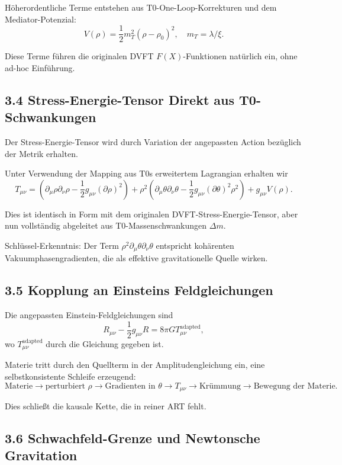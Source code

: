 \documentclass[12pt,a4paper]{article}
\begin{document}
	Höherordentliche Terme entstehen aus T0-One-Loop-Korrekturen und dem Mediator-Potenzial:
	\[
	V(\rho) = \frac{1}{2} m_T^2 (\rho - \rho_0)^2, \quad m_T = \lambda / \xi.
	\]
	
	Diese Terme führen die originalen DVFT $F(X)$-Funktionen natürlich ein, ohne ad-hoc Einführung.
	
	\subsection{3.4 Stress-Energie-Tensor Direkt aus T0-Schwankungen}
	
	Der Stress-Energie-Tensor wird durch Variation der angepassten Action bezüglich der Metrik erhalten.
	
	Unter Verwendung der Mapping aus T0s erweitertem Lagrangian erhalten wir
	\[
	T_{\mu\nu} = (\partial_\mu \rho \partial_\nu \rho - \frac{1}{2} g_{\mu\nu} (\partial \rho)^2) + \rho^2 (\partial_\mu \theta \partial_\nu \theta - \frac{1}{2} g_{\mu\nu} (\partial \theta)^2 \rho^2) + g_{\mu\nu} V(\rho).
	\]
	
	Dies ist identisch in Form mit dem originalen DVFT-Stress-Energie-Tensor, aber nun vollständig abgeleitet aus T0-Massenschwankungen $\Delta m$.
	
	Schlüssel-Erkenntnis: Der Term $\rho^2 \partial_\mu \theta \partial_\nu \theta$ entspricht kohärenten Vakuumphasengradienten, die als effektive gravitationelle Quelle wirken.
	
	\subsection{3.5 Kopplung an Einsteins Feldgleichungen}
	
	Die angepassten Einstein-Feldgleichungen sind
	\[
	R_{\mu\nu} - \frac{1}{2} g_{\mu\nu} R = 8\pi G T_{\mu\nu}^{\text{adapted}},
	\]
	wo $T_{\mu\nu}^{\text{adapted}}$ durch die Gleichung gegeben ist.
	
	Materie tritt durch den Quellterm in der Amplitudengleichung ein, eine selbstkonsistente Schleife erzeugend:
	\[
	\text{Materie} \to \text{perturbiert } \rho \to \text{Gradienten in } \theta \to T_{\mu\nu} \to \text{Krümmung} \to \text{Bewegung der Materie}.
	\]
	
	Dies schließt die kausale Kette, die in reiner ART fehlt.
	
	\subsection{3.6 Schwachfeld-Grenze und Newtonsche Gravitation}
	
\end{document}
